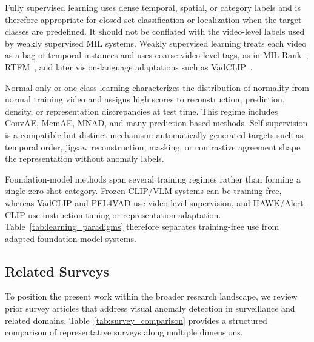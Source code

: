 \documentclass[10pt,a4paper]{article}
\begin{document}
Fully supervised learning uses dense temporal, spatial, or category labels and is therefore appropriate for closed-set classification or localization when the target classes are predefined. It should not be conflated with the video-level labels used by weakly supervised MIL systems. Weakly supervised learning treats each video as a bag of temporal instances and uses coarse video-level tags, as in MIL-Rank~\citep{sultani2018real}, RTFM~\citep{tian2021weakly}, and later vision-language adaptations such as VadCLIP~\citep{wu2024vadclip}.

Normal-only or one-class learning characterizes the distribution of normality from normal training video and assigns high scores to reconstruction, prediction, density, or representation discrepancies at test time. This regime includes ConvAE, MemAE, MNAD, and many prediction-based methods. Self-supervision is a compatible but distinct mechanism: automatically generated targets such as temporal order, jigsaw reconstruction, masking, or contrastive agreement shape the representation without anomaly labels.

Foundation-model methods span several training regimes rather than forming a single zero-shot category. Frozen CLIP/VLM systems can be training-free, whereas VadCLIP and PEL4VAD use video-level supervision, and HAWK/Alert-CLIP use instruction tuning or representation adaptation. Table~\ref{tab:learning_paradigms} therefore separates training-free use from adapted foundation-model systems.

\subsection{Related Surveys}
\label{subsec:related_surveys}

To position the present work within the broader research landscape, we review prior survey articles that address visual anomaly detection in surveillance and related domains. Table~\ref{tab:survey_comparison} provides a structured comparison of representative surveys along multiple dimensions.
\end{document}
